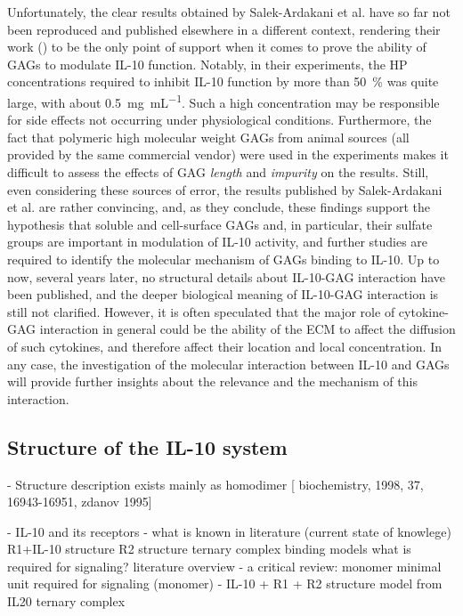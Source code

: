 Unfortunately, the clear results obtained by Salek-Ardakani et al. have so far
not been reproduced and published elsewhere in a different context, rendering
their work (\cite{salek_ardakani_2000}) to be the only point of support when it
comes to prove the ability of GAGs to modulate IL-10 function. Notably, in their
experiments, the HP concentrations required to inhibit IL-10 function by more
than \SI{50}{\percent} was quite large, with about
\SI{0.5}{\milli\gram\per\milli\liter}. Such a high concentration may be
responsible for side effects not occurring under physiological conditions.
Furthermore, the fact that polymeric high molecular weight GAGs from animal
sources (all provided by the same commercial vendor) were used in the
experiments makes it difficult to assess the effects of GAG \textit{length} and
\textit{impurity} on the results. Still, even considering these sources of
error, the results published by Salek-Ardakani et al. are rather convincing,
and, as they conclude, these findings support the hypothesis that soluble and
cell-surface GAGs and, in particular, their sulfate groups are important in
modulation of IL-10 activity, and further studies are required to identify the
molecular mechanism of GAGs binding to IL-10. Up to now, several years later, no
structural details about IL-10-GAG interaction have been published, and the
deeper biological meaning of IL-10-GAG interaction is still not clarified.
However, it is often speculated that the major role of cytokine-GAG interaction
in general could be the ability of the ECM to affect the diffusion of such
cytokines, and therefore affect their location and local concentration. In any
case, the investigation of the molecular interaction between IL-10 and GAGs will
provide further insights about the relevance and the mechanism of this
interaction.


\subsection{Structure of the IL-10 system}

    - Structure description
        exists mainly as homodimer [
            biochemistry, 1998, 37, 16943-16951, zdanov 1995]


    - IL-10 and its receptors
        - what is known in literature (current state of knowlege)
            R1+IL-10 structure
            R2 structure
            ternary complex binding models
            what is required for signaling? literature overview
        - a critical review: monomer
            minimal unit required for signaling (monomer)
        - IL-10 + R1 + R2 structure model from IL20 ternary complex


